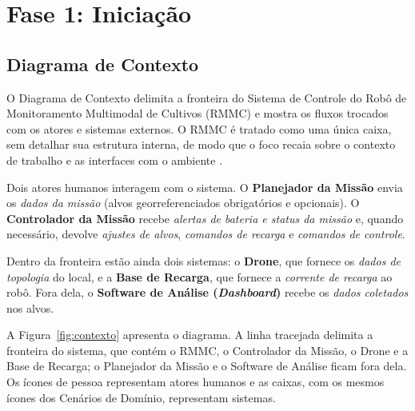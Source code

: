 \documentclass[a4paper, 12pt]{article}
\begin{document}
\section{Fase 1: Iniciação}

\subsection{Diagrama de Contexto}

O Diagrama de Contexto delimita a fronteira do Sistema de Controle do Robô de Monitoramento Multimodal de Cultivos (RMMC) e mostra os fluxos trocados com os atores e sistemas externos. O RMMC é tratado como uma única caixa, sem detalhar sua estrutura interna, de modo que o foco recaia sobre o contexto de trabalho e as interfaces com o ambiente \cite{robertson2012}.

Dois atores humanos interagem com o sistema. O \textbf{Planejador da Missão} envia os \textit{dados da missão} (alvos georreferenciados obrigatórios e opcionais). O \textbf{Controlador da Missão} recebe \textit{alertas de bateria e status da missão} e, quando necessário, devolve \textit{ajustes de alvos}, \textit{comandos de recarga} e \textit{comandos de controle}.

Dentro da fronteira estão ainda dois sistemas: o \textbf{Drone}, que fornece os \textit{dados de topologia} do local, e a \textbf{Base de Recarga}, que fornece a \textit{corrente de recarga} ao robô. Fora dela, o \textbf{Software de Análise (\textit{Dashboard})} recebe os \textit{dados coletados} nos alvos.

A Figura~\ref{fig:contexto} apresenta o diagrama. A linha tracejada delimita a fronteira do sistema, que contém o RMMC, o Controlador da Missão, o Drone e a Base de Recarga; o Planejador da Missão e o Software de Análise ficam fora dela. Os ícones de pessoa representam atores humanos e as caixas, com os mesmos ícones dos Cenários de Domínio, representam sistemas.
\end{document}
